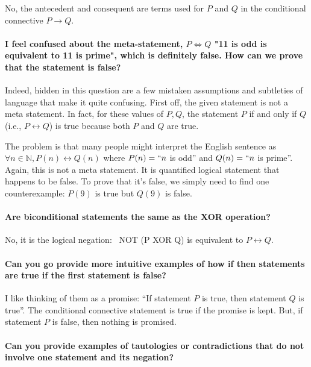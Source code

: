 \documentclass[10pt,english]{article}
\begin{document}
No, the antecedent and consequent are terms used for $P$ and $Q$ in the conditional connective $P \rightarrow Q$.

\paragraph{I feel confused about the meta-statement, $P \Leftrightarrow Q$ "11 is odd is equivalent to 11 is prime", which is definitely false. How can we prove that the statement is false?}

Indeed, hidden in this question are a few mistaken assumptions and subtleties of language that make it quite confusing.  First off, the given statement is not a meta statement.  In fact, for these values of $P,Q$, the statement $P$ if and only if $Q$ (i.e., $P \leftrightarrow Q$) is true because both $P$ and $Q$ are true.

The problem is that many people might interpret the English sentence as $\forall n\in \mathbb{N}, P(n) \leftrightarrow Q(n)$ where $P(n)=``n$ is odd'' and $Q(n)=``n$ is prime''.  Again, this is not a meta statement.  It is quantified logical statement that happens to be false.  To prove that it's false, we simply need to find one counterexample: $P(9)$ is true but $Q(9)$ is false.


\paragraph{Are biconditional statements the same as the XOR operation?}

No, it is the logical negation:  NOT (P XOR Q) is equivalent to $P \leftrightarrow Q$.

\paragraph{Can you go provide more intuitive examples of how if then statements are true if the first statement is false?}

I like thinking of them as a promise: ``If statement $P$ is true, then statement $Q$ is true''.  The conditional connective statement is true if the promise is kept. But, if statement $P$ is false, then nothing is promised.

\paragraph{Can you provide examples of tautologies or contradictions that do not involve one statement and its negation?}
\end{document}
